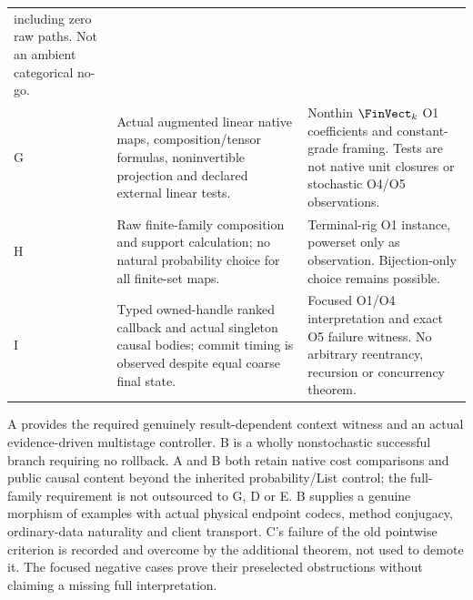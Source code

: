 \begin{longtable}{@{}p{.08\linewidth}p{.45\linewidth}p{.37\linewidth}@{}}
including zero raw paths. Not an ambient categorical no-go.\\
G&Actual augmented linear native maps, composition/tensor formulas,
noninvertible projection and declared external linear tests.&Nonthin
$\FinVect_k$ O1 coefficients and constant-grade framing. Tests are not
native unit closures or stochastic O4/O5 observations.\\
H&Raw finite-family composition and support calculation; no natural
probability choice for all finite-set maps.&Terminal-rig O1 instance,
powerset only as observation. Bijection-only choice remains possible.\\
I&Typed owned-handle ranked callback and actual singleton causal bodies;
commit timing is observed despite equal coarse final state.&Focused O1/O4
interpretation and exact O5 failure witness. No arbitrary reentrancy,
recursion or concurrency theorem.\\
\bottomrule
\end{longtable}

A provides the required genuinely result-dependent context witness and
an actual evidence-driven multistage controller. B is a wholly
nonstochastic successful branch requiring no rollback. A and B both retain
native cost comparisons and public causal content beyond the inherited
probability/List control; the full-family requirement is not outsourced
to G, D or E. B supplies a genuine morphism of examples with actual
physical endpoint codecs, method conjugacy, ordinary-data naturality and
client transport. C's failure of the old pointwise criterion is recorded
and overcome by the additional theorem, not used to demote it. The
focused negative cases prove their preselected obstructions without
claiming a missing full interpretation.

